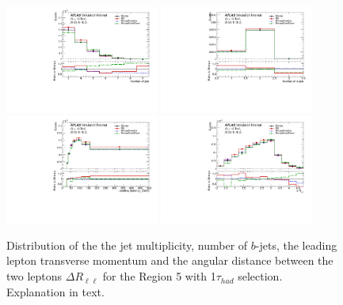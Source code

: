 \begin{figure}[!htb]
\centering
\includegraphics[width=0.45\textwidth]{Plots/ttV/c_Region_4_nJets}
\includegraphics[width=0.45\textwidth]{Plots/ttV/c_Region_4_nBtagJets}\\
\includegraphics[width=0.45\textwidth]{Plots/ttV/c_Region_4_lep_Pt_0} 
\includegraphics[width=0.45\textwidth]{Plots/ttV/c_Region_4_DRll01}\\
  \caption{Distribution of the the jet multiplicity, number of $b$-jets, the leading lepton transverse momentum and the angular distance between the two leptons  $\Delta R _{\ell \ell }$ for the Region 5 with 1$\tau_{had}$ selection. Explanation in text.
   \label{ttV:tauR_kin}}
\end{figure}
% 


